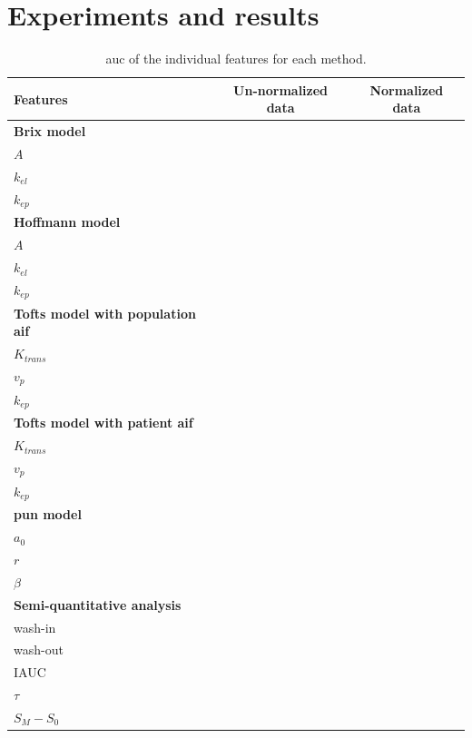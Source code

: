 \section{Experiments and results}\label{sec:experiments}

\begin{table}
  \caption{\acs*{auc} of the individual features for each method.}
  \centering
  \begin{tabular}{l c c}
    \toprule
    \textbf{Features} & Un-normalized data & Normalized data \\
    \midrule
    \textbf{Brix model} & & \\
    \quad $A$         & & \\
    \quad $k_{el}$    & & \\
    \quad $k_{ep}$    & & \\
    \textbf{Hoffmann model} & & \\
    \quad $A$         & & \\
    \quad $k_{el}$    & & \\
    \quad $k_{ep}$    & & \\
    \textbf{Tofts model with population \ac{aif}} & & \\
    \quad $K_{trans}$ & & \\
    \quad $v_{p}$     & & \\
    \quad $k_{ep}$    & & \\
    \textbf{Tofts model with patient \ac{aif}} & & \\
    \quad $K_{trans}$ & & \\
    \quad $v_{p}$     & & \\
    \quad $k_{ep}$    & & \\
    \textbf{\ac{pun} model} & & \\
    \quad $a_0$       & & \\
    \quad $r$         & & \\
    \quad $\beta$     & & \\
    \textbf{Semi-quantitative analysis} & & \\
    \quad wash-in     & & \\
    \quad wash-out    & & \\
    \quad IAUC        & & \\
    \quad $\tau$      & & \\
    \quad $S_M - S_0$ & & \\
    \bottomrule
  \end{tabular}
  \label{tab:resfeats}
\end{table}

